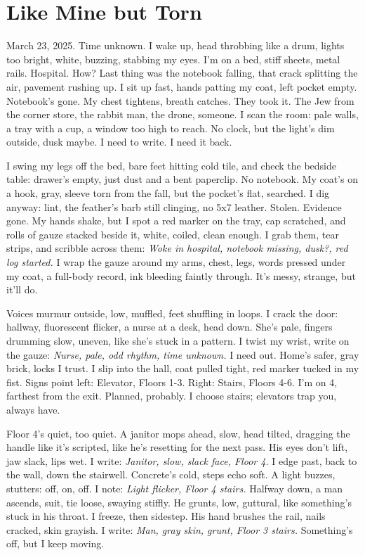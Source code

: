 \documentclass{article}
\begin{document}
\section{Like Mine but Torn}

March 23, 2025. Time unknown. I wake up, head throbbing like a drum, lights too bright, white, buzzing, stabbing my eyes. I'm on a bed, stiff sheets, metal rails. Hospital. How? Last thing was the notebook falling, that crack splitting the air, pavement rushing up. I sit up fast, hands patting my coat, left pocket empty. Notebook's gone. My chest tightens, breath catches. They took it. The Jew from the corner store, the rabbit man, the drone, someone. I scan the room: pale walls, a tray with a cup, a window too high to reach. No clock, but the light's dim outside, dusk maybe. I need to write. I need it back.

I swing my legs off the bed, bare feet hitting cold tile, and check the bedside table: drawer's empty, just dust and a bent paperclip. No notebook. My coat's on a hook, gray, sleeve torn from the fall, but the pocket's flat, searched. I dig anyway: lint, the feather's barb still clinging, no 5x7 leather. Stolen. Evidence gone. My hands shake, but I spot a red marker on the tray, cap scratched, and rolls of gauze stacked beside it, white, coiled, clean enough. I grab them, tear strips, and scribble across them: \textit{Woke in hospital, notebook missing, dusk?, red log started.} I wrap the gauze around my arms, chest, legs, words pressed under my coat, a full-body record, ink bleeding faintly through. It's messy, strange, but it'll do.

Voices murmur outside, low, muffled, feet shuffling in loops. I crack the door: hallway, fluorescent flicker, a nurse at a desk, head down. She's pale, fingers drumming slow, uneven, like she's stuck in a pattern. I twist my wrist, write on the gauze: \textit{Nurse, pale, odd rhythm, time unknown.} I need out. Home's safer, gray brick, locks I trust. I slip into the hall, coat pulled tight, red marker tucked in my fist. Signs point left: Elevator, Floors 1-3. Right: Stairs, Floors 4-6. I'm on 4, farthest from the exit. Planned, probably. I choose stairs; elevators trap you, always have.

Floor 4's quiet, too quiet. A janitor mops ahead, slow, head tilted, dragging the handle like it's scripted, like he's resetting for the next pass. His eyes don't lift, jaw slack, lips wet. I write: \textit{Janitor, slow, slack face, Floor 4.} I edge past, back to the wall, down the stairwell. Concrete's cold, steps echo soft. A light buzzes, stutters: off, on, off. I note: \textit{Light flicker, Floor 4 stairs.} Halfway down, a man ascends, suit, tie loose, swaying stiffly. He grunts, low, guttural, like something's stuck in his throat. I freeze, then sidestep. His hand brushes the rail, nails cracked, skin grayish. I write: \textit{Man, gray skin, grunt, Floor 3 stairs.} Something's off, but I keep moving.
\end{document}
